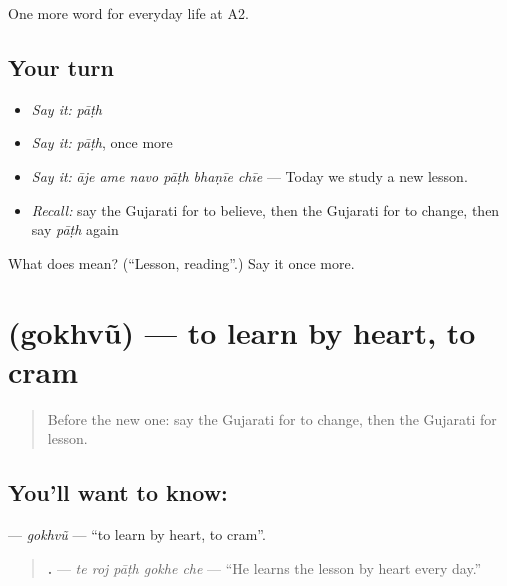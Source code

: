 \begin{grammarlens}[title={What you've built}]
One more word for everyday life at A2.
\end{grammarlens}

\subsection*{Your turn}
\begin{itemize}
\raggedright
  \item \emph{Say it:} \emph{pāṭh}
  \item \emph{Say it:} \emph{pāṭh}, once more
  \item \emph{Say it:} \emph{āje ame navo pāṭh bhaṇīe chīe} — Today we study a new lesson.
  \item \emph{Recall:} say the Gujarati for to believe, then the Gujarati for to change, then say \emph{pāṭh} again
\end{itemize}

\begin{tcolorbox}[breakable,colback=teal!4,colframe=teal!35!black,title={Before you move on}]
What does  mean? (\textquotedblleft{}Lesson, reading\textquotedblright{}.) Say it once more.
\end{tcolorbox}
\section[\texorpdfstring{\gu{ગોખવું} (gokhvũ)}{ગોખવું (gokhvũ)}]{ (gokhvũ) — to learn by heart, to cram}

\label{lesson:GU-C243-gokhvu}



\begin{quote}
Before the new one: say the Gujarati for to change, then the Gujarati for lesson.
\end{quote}

\subsection*{You'll want to know: }
\textbf{} — \emph{gokhvũ} — \textquotedblleft{}to learn by heart, to cram\textquotedblright{}.

\begin{quote}
\textbf{    .} — \emph{te roj pāṭh gokhe che} — \textquotedblleft{}He learns the lesson by heart every day.\textquotedblright{}
\end{quote}

